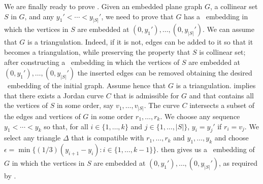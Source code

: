 We are finally ready to prove . Given an embedded plane graph $G$, a collinear set $S$ in $G$,
	and any $y_1'<\cdots<y_{|S|}'$, we need to prove that $G$ has
	a \Fary\ embedding in which the vertices in $S$ are embedded at
	$(0,y_1'),\ldots,(0,y_{|S|}')$. We can assume that $G$ is a triangulation. Indeed, if it is not,  edges can be added to it so that it becomes a triangulation, while preserving the property that $S$ is collinear set; after constructing a \Fary\ embedding in which the vertices of $S$ are embedded at $(0,y_1'),\ldots,(0,y_{|S|}')$ the inserted edges can be removed obtaining the desired \Fary\ embedding of the initial graph. Assume hence that $G$ is a triangulation. 	  implies
	that there exists a Jordan curve $C$ that is admissible for $G$
	and that contains all the vertices of $S$ in some order, say
	$v_1,\ldots,v_{|S|}$.  The curve $C$ intersects a subset of the edges
	and vertices of $G$ in some order $r_1,\ldots,r_k$.  We choose any
	sequence $y_1<\cdots<y_k$ so that, for all $i\in\{1,\ldots,k\}$ and
	$j\in\{1,\ldots,|S|\}$, $y_i = y_j'$ if $r_i=v_j$.  We select
	any triangle $\Delta$ that is compatible with $r_1,\ldots,r_k$ and
	$y_1,\ldots,y_k$ and choose $\epsilon = \min\{(1/3)(y_{i+1}-y_{i}):
	i\in\{1,\ldots,k-1\}\}$.   then gives us a \Fary\
	embedding of $G$ in which the vertices in $S$ are embedded at $(0,y_1'),\ldots,(0,y_{|S|}')$, as required by .


